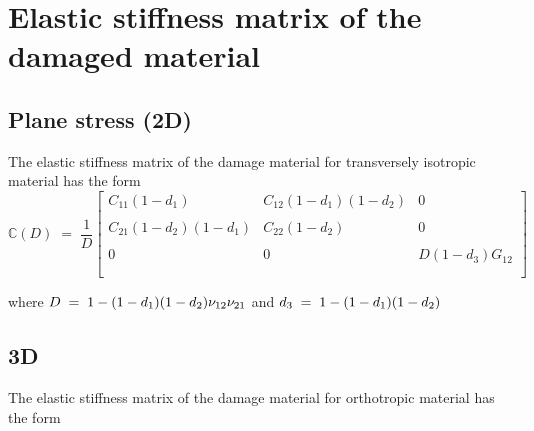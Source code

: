 \documentclass[12pt]{report}
\newcounter{savepage}
\begin{document}
\newpage
{}
\appendix
\renewcommand{\thesection}{\Alph{section}.\arabic{section}}
\setcounter{page}{\thesavepage}
\section{Elastic stiffness matrix of the damaged material}
\subsection{Plane stress (2D)}
\indent\indent\indent The elastic stiffness matrix of the damage material for transversely isotropic material has the form \\

\begin{equation*}
\mathbb{C}(D) \; = \; \frac{1}{D}
 \begin{bmatrix}
  C_{11}(1 - d_{1}) & C_{12}(1 - d_{1})(1 - d_{2})  & 0 \\
  \\
  C_{21}(1 - d_{2})(1 - d_{1}) & C_{22}(1 - d_{2}) & 0 \\
 \\  
  0 & 0 &  D(1 - d_{3})G_{12} \\
  \\
 \end{bmatrix}
\end{equation*}

where $\mathlarger{D \; = \; 1 - (1 - d_{1})(1 - d_{2}) \nu_{12}\nu_{21}}$ and $\mathlarger{d_{3} \; = \; 1 - (1 - d_{1})(1 - d_{2}) }$



\subsection{3D}
\indent\indent\indent The elastic stiffness matrix of the damage material for orthotropic material has the form \\
\end{document}
